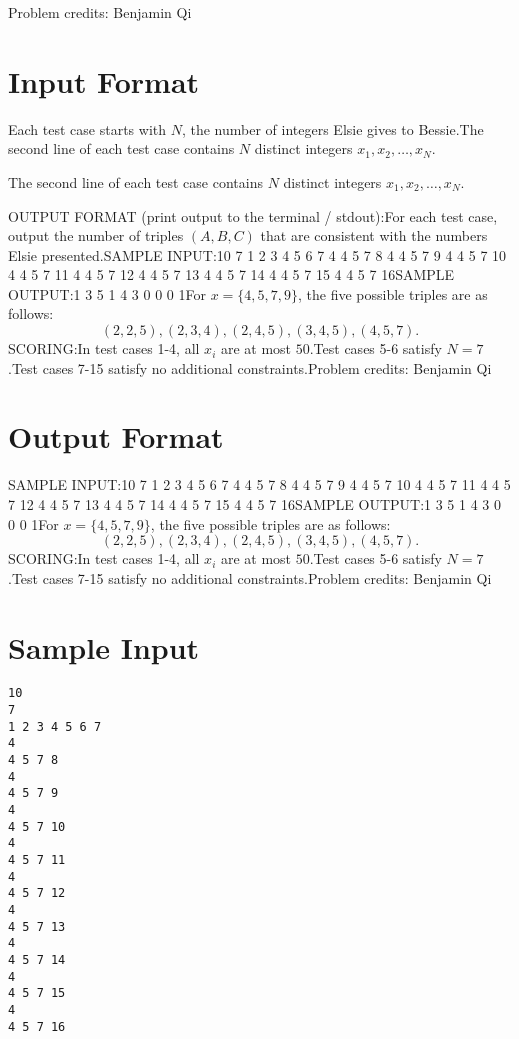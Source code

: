 \documentclass[12pt]{article}
\begin{document}
Problem credits: Benjamin Qi



\section*{Input Format}
Each test case starts with $N$, the number of integers Elsie gives to Bessie.The second line of each test case contains $N$ distinct integers
$x_1,x_2,\ldots,x_N$.

The second line of each test case contains $N$ distinct integers
$x_1,x_2,\ldots,x_N$.

OUTPUT FORMAT (print output to the terminal / stdout):For each test case, output the number of triples $(A,B,C)$ that are consistent
with the numbers Elsie presented.SAMPLE INPUT:10
7
1 2 3 4 5 6 7
4
4 5 7 8
4
4 5 7 9
4
4 5 7 10
4
4 5 7 11
4
4 5 7 12
4
4 5 7 13
4
4 5 7 14
4
4 5 7 15
4
4 5 7 16SAMPLE OUTPUT:1
3
5
1
4
3
0
0
0
1For $x=\{4,5,7,9\}$, the five possible triples are as follows:$$(2, 2, 5), (2, 3, 4), (2, 4, 5), (3, 4, 5), (4, 5, 7).$$SCORING:In test cases 1-4, all $x_i$ are at most $50$.Test cases 5-6 satisfy $N=7$.Test cases 7-15 satisfy no additional constraints.Problem credits: Benjamin Qi

\section*{Output Format}
SAMPLE INPUT:10
7
1 2 3 4 5 6 7
4
4 5 7 8
4
4 5 7 9
4
4 5 7 10
4
4 5 7 11
4
4 5 7 12
4
4 5 7 13
4
4 5 7 14
4
4 5 7 15
4
4 5 7 16SAMPLE OUTPUT:1
3
5
1
4
3
0
0
0
1For $x=\{4,5,7,9\}$, the five possible triples are as follows:$$(2, 2, 5), (2, 3, 4), (2, 4, 5), (3, 4, 5), (4, 5, 7).$$SCORING:In test cases 1-4, all $x_i$ are at most $50$.Test cases 5-6 satisfy $N=7$.Test cases 7-15 satisfy no additional constraints.Problem credits: Benjamin Qi

\section*{Sample Input}
\begin{verbatim}
10
7
1 2 3 4 5 6 7
4
4 5 7 8
4
4 5 7 9
4
4 5 7 10
4
4 5 7 11
4
4 5 7 12
4
4 5 7 13
4
4 5 7 14
4
4 5 7 15
4
4 5 7 16
\end{verbatim}
\end{document}

